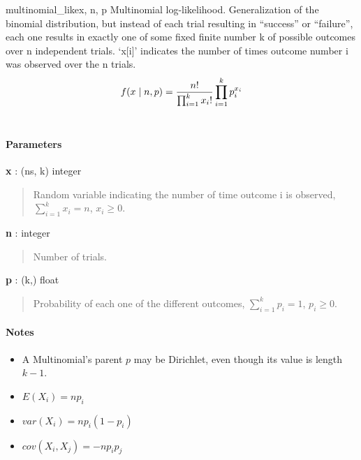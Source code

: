 \hypertarget{pymc.distributions.multinomial_like}{}
\begin{funcdesc}{multinomial\_like}{x, n, p}
Multinomial log-likelihood. Generalization of the binomial
distribution, but instead of each trial resulting in ``success'' or
``failure'', each one results in exactly one of some fixed finite number k
of possible outcomes over n independent trials. `x{[}i{]}' indicates the number
of times outcome number i was observed over the n trials.
\begin{gather}
\begin{split}f(x \mid n, p) = \frac{n!}{\prod_{i=1}^k x_i!} \prod_{i=1}^k p_i^{x_i}\end{split}\notag\\\begin{split}\end{split}\notag
\end{gather}\paragraph{Parameters}\begin{paramlist}

\item[] \textbf{x} : (ns, k) integer
\begin{quote}

Random variable indicating the number of time outcome i is observed,
$\sum_{i=1}^k x_i=n$, $x_i \ge 0$.
\end{quote}

\item[] \textbf{n} : integer
\begin{quote}

Number of trials.
\end{quote}

\item[] \textbf{p} : (k,) float
\begin{quote}

Probability of each one of the different outcomes,
$\sum_{i=1}^k p_i = 1$, $p_i \ge 0$.
\end{quote}
\end{paramlist}
\paragraph{Notes}
\begin{itemize}
\item {} A Multinomial's parent $p$ may be Dirichlet, even though its value is length $k-1$.

\item {}
$E(X_i)=n p_i$

\item {}
$var(X_i)=n p_i(1-p_i)$

\item {}
$cov(X_i,X_j) = -n p_i p_j$

\end{itemize}
\end{funcdesc}



